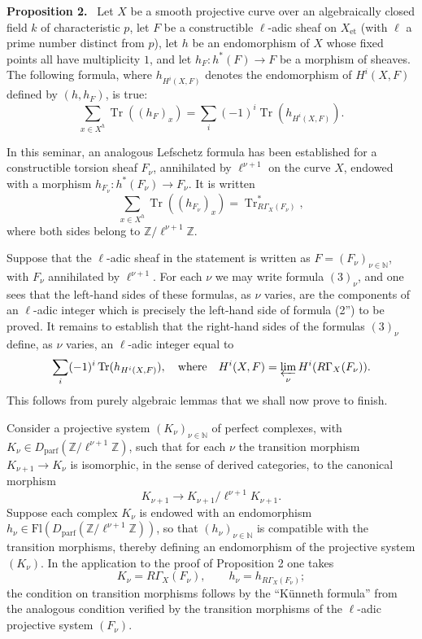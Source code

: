 \documentclass[11pt]{article}
\newenvironment{statement}[1]{\par\medskip\noindent\textbf{#1.}\ }{\par\medskip}
\providecommand{\Tr}{\operatorname{Tr}}
\providecommand{\Tr}{\operatorname{Tr}}
\providecommand{\Tr}{\operatorname{Tr}}
\providecommand{\Tr}{\operatorname{Tr}}
\providecommand{\Tr}{\operatorname{Tr}}
\begin{document}
\begin{statement}{Proposition 2}
Let $X$ be a smooth projective curve over an algebraically closed field $k$ of characteristic $p$, let $F$ be a constructible $\ell$-adic sheaf on $X_{\mathrm{et}}$ (with $\ell$ a prime number distinct from $p$), let $h$ be an endomorphism of $X$ whose fixed points all have multiplicity $1$, and let $h_F:h^*(F)\to F$ be a morphism of sheaves. The following formula, where $h_{H^i(X,F)}$ denotes the endomorphism of $H^i(X,F)$ defined by $(h,h_F)$, is true:
\[
\sum_{x\in X^h}\Tr((h_F)_x)=\sum_i(-1)^i\Tr(h_{H^i(X,F)}).
\tag{2''}
\]
\end{statement}

In this seminar, an analogous Lefschetz formula has been established for a constructible torsion sheaf $F_\nu$, annihilated by $\ell^{\nu+1}$ on the curve $X$, endowed with a morphism $h_{F_\nu}:h^*(F_\nu)\to F_\nu$. It is written
\[
\sum_{x\in X^h}\Tr((h_{F_\nu})_x)=\Tr^*_{R\Gamma_X(F_\nu)},
\tag{3}
\]
where both sides belong to $\mathbb Z/\ell^{\nu+1}\mathbb Z$.

Suppose that the $\ell$-adic sheaf in the statement is written as $F=(F_\nu)_{\nu\in\mathbb N}$, with $F_\nu$ annihilated by $\ell^{\nu+1}$. For each $\nu$ we may write formula $(3)_\nu$, and one sees that the left-hand sides of these formulas, as $\nu$ varies, are the components of an $\ell$-adic integer which is precisely the left-hand side of formula (2'') to be proved. It remains to establish that the right-hand sides of the formulas $(3)_\nu$ define, as $\nu$ varies, an $\ell$-adic integer equal to
\[
\sum_i(-1)^i\Tr(h_{H^i(X,F)}),
\quad\text{where}\quad
H^i(X,F)=\varprojlim_\nu H^i(R\Gamma_X(F_\nu)).
\]
This follows from purely algebraic lemmas that we shall now prove to finish.

Consider a projective system $(K_\nu)_{\nu\in\mathbb N}$ of perfect complexes, with $K_\nu\in D_{\mathrm{parf}}(\mathbb Z/\ell^{\nu+1}\mathbb Z)$, such that for each $\nu$ the transition morphism $K_{\nu+1}\to K_\nu$ is isomorphic, in the sense of derived categories, to the canonical morphism
\[
K_{\nu+1}\to K_{\nu+1}/\ell^{\nu+1}K_{\nu+1}.
\]
Suppose each complex $K_\nu$ is endowed with an endomorphism $h_\nu\in\mathrm{Fl}(D_{\mathrm{parf}}(\mathbb Z/\ell^{\nu+1}\mathbb Z))$, so that $(h_\nu)_{\nu\in\mathbb N}$ is compatible with the transition morphisms, thereby defining an endomorphism of the projective system $(K_\nu)$. In the application to the proof of Proposition 2 one takes
\[
K_\nu=R\Gamma_X(F_\nu),\qquad h_\nu=h_{R\Gamma_X(F_\nu)};
\]
the condition on transition morphisms follows by the ``Künneth formula'' from the analogous condition verified by the transition morphisms of the $\ell$-adic projective system $(F_\nu)$.
\end{document}
